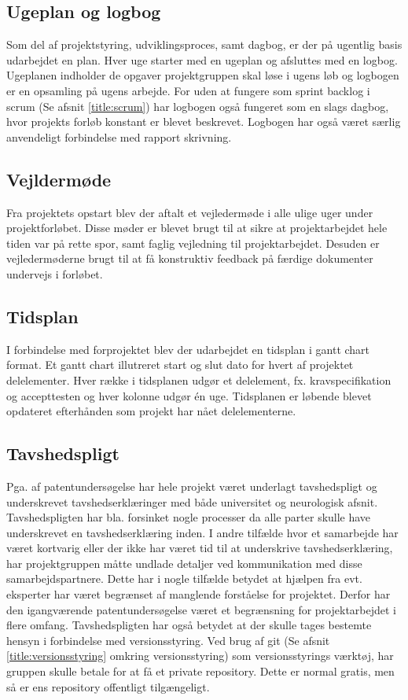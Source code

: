 \subsection{Ugeplan og logbog}
Som del af projektstyring, udviklingsproces, samt dagbog, er der på ugentlig basis udarbejdet en plan. Hver uge starter med en ugeplan og afsluttes med en logbog. Ugeplanen indholder de opgaver projektgruppen skal løse i ugens løb og logbogen er en opsamling på ugens arbejde. For uden at fungere som sprint backlog i scrum (Se afsnit \ref{title:scrum}) har logbogen også fungeret som en slags dagbog, hvor projekts forløb konstant er blevet beskrevet. Logbogen har også været særlig anvendeligt forbindelse med rapport skrivning. 

\subsection{Vejldermøde}
Fra projektets opstart blev der aftalt et vejledermøde i alle ulige uger under projektforløbet. Disse møder er blevet brugt til at sikre at projektarbejdet hele tiden var på rette spor, samt faglig vejledning til projektarbejdet. Desuden er vejledermøderne brugt til at få konstruktiv feedback på færdige dokumenter undervejs i forløbet. 

\subsection{Tidsplan}
I forbindelse med forprojektet blev der udarbejdet en tidsplan i gantt chart format. Et gantt chart illutreret start og slut dato for hvert af projektet delelementer. Hver række i tidsplanen udgør et delelement, fx. kravspecifikation og accepttesten og hver kolonne udgør én uge. Tidsplanen er løbende blevet opdateret efterhånden som projekt har nået delelementerne.  

\subsection{Tavshedspligt} \label{title:tavshedspligt}
Pga. af patentundersøgelse har hele projekt været underlagt tavshedspligt og underskrevet tavshedserklæringer med både universitet og neurologisk afsnit. Tavshedspligten har bla. forsinket nogle processer da alle parter skulle have underskrevet en tavshedserklæring inden. I andre tilfælde hvor et samarbejde har været kortvarig eller der ikke har været tid til at underskrive tavshedserklæring, har projektgruppen måtte undlade detaljer ved kommunikation med disse samarbejdspartnere. Dette har i nogle tilfælde betydet at hjælpen fra evt. eksperter har været begrænset af manglende forståelse for projektet.  Derfor har den igangværende patentundersøgelse været et begrænsning for projektarbejdet i flere omfang. 
Tavshedspligten har også betydet at der skulle tages bestemte hensyn i forbindelse med versionsstyring. Ved brug af git (Se afsnit \ref{title:versionsstyring} omkring versionsstyring) som versionsstyrings værktøj, har gruppen skulle betale for at få et private repository. Dette er normal gratis, men så er ens repository offentligt tilgængeligt. 


